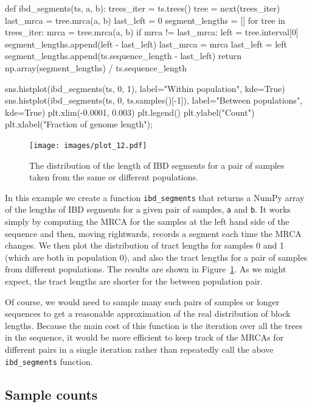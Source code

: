 \documentclass[graybox]{svmult}
\begin{document}
\begin{pythoncode}
def ibd_segments(ts, a, b):
    trees_iter = ts.trees()
    tree = next(trees_iter)
    last_mrca = tree.mrca(a, b)
    last_left = 0
    segment_lengths = []
    for tree in trees_iter:
        mrca = tree.mrca(a, b)
        if mrca != last_mrca:
            left = tree.interval[0]
            segment_lengths.append(left - last_left)
            last_mrca = mrca
            last_left = left
    segment_lengths.append(ts.sequence_length - last_left)
    return np.array(segment_lengths) / ts.sequence_length

sns.histplot(ibd_segments(ts, 0, 1),
    label="Within population", kde=True)
sns.histplot(ibd_segments(ts, 0, ts.samples()[-1]),
    label="Between populations", kde=True)
plt.xlim(-0.0001, 0.003)
plt.legend()
plt.ylabel("Count")
plt.xlabel("Fraction of genome length");
\end{pythoncode}

\begin{figure}
\begin{center}
\texttt{[image: images/plot\_12.pdf]}
\end{center}
\caption{\label{fig:ibd_segments} The distribution of the length of IBD
segments for a pair of samples taken from the same or different populations.}
\end{figure}

In this example we create a function \texttt{ibd\_segments} that returns
a NumPy array of the lengths of IBD segments for a given pair of
samples, \texttt{a} and \texttt{b}. It works simply by computing the
MRCA for the samples at the left hand side of the sequence and then,
moving rightwards, records a segment each time the MRCA changes. We then
plot the distribution of tract lengths for samples 0 and 1 (which are
both in population 0), and also the tract lengths for a pair of
samples from different populations. The results are shown in
Figure~\ref{fig:ibd_segments}. As we might expect, the tract
lengths are shorter for the between population pair.

Of course, we would need to sample many such pairs of samples or longer sequences to
get a reasonable approximation of the real distribution of block lengths.
Because the main cost of this function is the iteration over all the
trees in the sequence, it would be more efficient to keep track of the MRCAs
for different pairs in a single iteration rather than repeatedly
call the above \texttt{ibd\_segments} function.

\subsection{Sample counts}\label{sample-counts}
\end{document}
